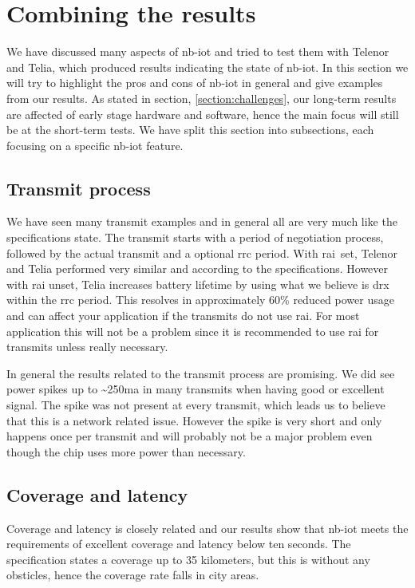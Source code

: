 \documentclass[USenglish]{ifimaster}  %
\begin{document}
\section{Combining the results}
We have discussed many aspects of \acrshort{nb-iot} and tried to test them with Telenor and Telia, which produced results indicating the state of \acrshort{nb-iot}. In this section we will try to highlight the pros and cons of \acrshort{nb-iot} in general and give examples from our results. As stated in section, \vref{section:challenges}, our long-term results are affected of early stage hardware and software, hence the main focus will still be at the short-term tests. We have split this section into subsections, each focusing on a specific \acrshort{nb-iot} feature.

\subsection{Transmit process}
We have seen many transmit examples and in general all are very much like the specifications state. The transmit starts with a period of negotiation process, followed by the actual transmit and a optional \acrshort{rrc} period. With \acrshort{rai} set, Telenor and Telia performed very similar and according to the specifications. However with \acrshort{rai} unset, Telia increases battery lifetime by using what we believe is \acrshort{drx} within the \acrshort{rrc} period. This resolves in approximately 60\% reduced power usage and can affect your application if the transmits do not use \acrshort{rai}. For most application this will not be a problem since it is recommended to use \acrshort{rai} for transmits unless really necessary.

In general the results related to the transmit process are promising. We did see power spikes up to \textasciitilde250\acrshort{ma} in many transmits when having good or excellent signal. The spike was not present at every transmit, which leads us to believe that this is a network related issue. However the spike is very short and only happens once per transmit and will probably not be a major problem even though the chip uses more power than necessary.

\subsection{Coverage and latency}
Coverage and latency is closely related and our results show that \acrshort{nb-iot} meets the requirements of excellent coverage and latency below ten seconds. The specification states a coverage up to 35 kilometers, but this is without any obsticles, hence the coverage rate falls in city areas.
\end{document}
